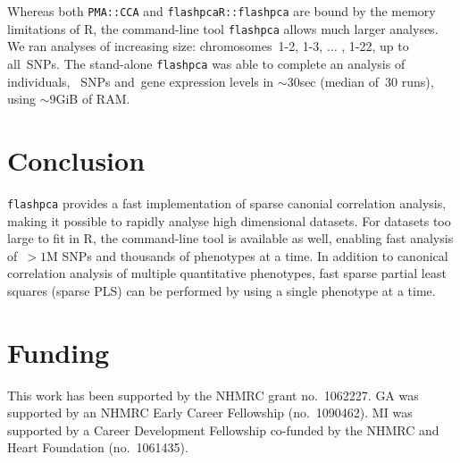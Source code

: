 \documentclass{bioinfo}
\begin{document}
Whereas both \texttt{PMA::CCA} and \texttt{flashpcaR::flashpca} are
bound by the memory limitations of \textsf{R}, the command-line tool
\texttt{flashpca} allows much larger analyses. We ran analyses of increasing
size: chromosomes~1-2, 1-3, $\hdots$ , 1-22, up to all~\nsnps SNPs. The
stand-alone \texttt{flashpca} was able to complete an analysis of~\nindiv
individuals, ~\nsnps SNPs and~\ngenes gene expression levels in ${\sim}30$sec
(median of~30 runs), using ${\sim}9$GiB of RAM.

\vspace*{-12pt}
\section{Conclusion}

\texttt{flashpca} provides a fast implementation of sparse canonial correlation
analysis, making it possible to rapidly analyse high dimensional datasets.  For
datasets too large to fit in \textsf{R}, the command-line tool is available as
well, enabling fast analysis of~${>}1$M SNPs and thousands of phenotypes at a
time.  In addition to canonical correlation analysis of multiple quantitative
phenotypes, fast sparse partial least squares (sparse PLS) can be performed by
using a single phenotype at a time.


\vspace*{-12pt}
\section*{Funding}

This work has been supported by the NHMRC grant no.~1062227. GA was supported by
an NHMRC Early Career Fellowship (no.~1090462). MI was supported by a Career
Development Fellowship co-funded by the NHMRC and Heart Foundation
(no.~1061435).

\vspace*{-12pt}




%
%
%
%
%
%
%
\end{document}
